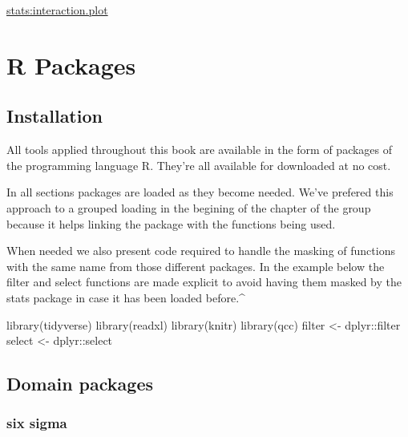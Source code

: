 \documentclass[
]{book}
\newenvironment{Shaded}{\begin{snugshade}}{\end{snugshade}}
\newcommand{\FunctionTok}[1]{\textcolor[rgb]{0.00,0.00,0.00}{#1}}
\newcommand{\NormalTok}[1]{#1}
\newcommand{\OtherTok}[1]{\textcolor[rgb]{0.56,0.35,0.01}{#1}}
\newcommand{\SpecialCharTok}[1]{\textcolor[rgb]{0.00,0.00,0.00}{#1}}
\begin{document}
\protect\hyperlink{interactionPlot}{stats:interaction.plot}

\hypertarget{r-packages}{%
\section{R Packages}\label{r-packages}}

\hypertarget{installation}{%
\subsection{Installation}\label{installation}}

All tools applied throughout this book are available in the form of packages of the programming language R. They're all available for downloaded at no cost.

In all sections packages are loaded as they become needed. We've prefered this approach to a grouped loading in the begining of the chapter of the group because it helps linking the package with the functions being used.

When needed we also present code required to handle the masking of functions with the same name from those different packages. In the example below the filter and select functions are made explicit to avoid having them masked by the stats package in case it has been loaded before.\^{}

\begin{Shaded}
\begin{Highlighting}[]
\FunctionTok{library}\NormalTok{(tidyverse)}
\FunctionTok{library}\NormalTok{(readxl)}
\FunctionTok{library}\NormalTok{(knitr)}
\FunctionTok{library}\NormalTok{(qcc)}
\NormalTok{filter }\OtherTok{\textless{}{-}}\NormalTok{ dplyr}\SpecialCharTok{::}\NormalTok{filter}
\NormalTok{select }\OtherTok{\textless{}{-}}\NormalTok{ dplyr}\SpecialCharTok{::}\NormalTok{select}
\end{Highlighting}
\end{Shaded}

\hypertarget{domain-packages}{%
\subsection{Domain packages}\label{domain-packages}}

\hypertarget{six-sigma}{%
\subsubsection{six sigma}\label{six-sigma}}
\end{document}
